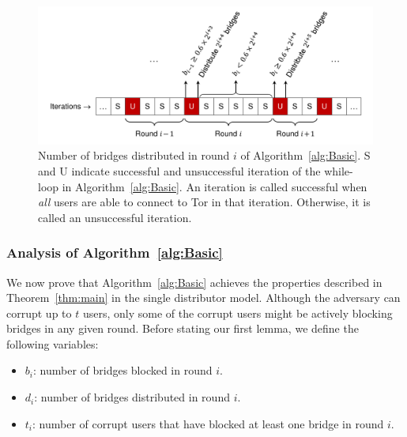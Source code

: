 \documentclass[a4paper,UKenglish]{lipics-v2016}
\begin{document}
\begin{figure}
	\centering
	\includegraphics[width=0.85\linewidth]{images/rounds}
	\caption{Number of bridges distributed in round $i$ of Algorithm~\ref{alg:Basic}. S and U indicate successful and unsuccessful iteration of the while-loop in Algorithm~\ref{alg:Basic}. An iteration is called successful when \emph{all} users are able to connect to Tor in that iteration. Otherwise, it is called an unsuccessful iteration. }
	\label{fig:rounds}
\end{figure}

\subsubsection{Analysis of Algorithm~\ref{alg:Basic}} \label{sec:ProofBasic}
We now prove that Algorithm~\ref{alg:Basic} achieves the properties described in Theorem~\ref{thm:main} in the single distributor model. 
Although the adversary can corrupt up to $t$ users, only some of the corrupt users might be actively blocking bridges in any given round. %
Before stating our first lemma, we define the following variables:
\begin{itemize}
	\item $b_i$: number of bridges blocked in round $i$.	
	\item $d_i$: number of bridges distributed in round $i$.
	\item $t_i$: number of corrupt users that have blocked at least one bridge in round $i$.
\end{itemize}
\end{document}
